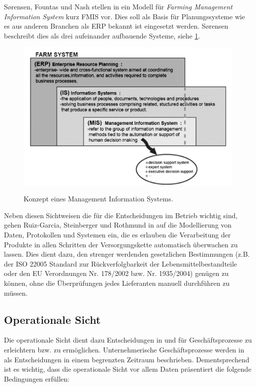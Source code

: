 S\o rensen, Fountas und Nash stellen in \cite{jour:Sorensen2010} ein Modell für \textit{Farming Management Information System} kurz FMIS vor. Dies soll als Basis für Planungssysteme wie es aus anderen Branchen als ERP bekannt ist eingesetzt werden. S\o rensen beschreibt dies als drei aufeinander aufbauende Systeme, siehe  \ref{fig:fmishierarchy}.

\begin{figure}[h]
 \includegraphics[scale=0.5,natwidth=\textwidth]{figures/datamodelling/sorensen_fmis_2010.png}
 \centering
 \label{fig:fmishierarchy}
 \caption{Konzept eines Management Information Systems.\cite{jour:Sorensen2010}}
\end{figure}

Neben diesen Sichtweisen die für die Entscheidungen im Betrieb wichtig sind, gehen Ruiz-Garcia, Steinberger und Rothmund in \cite{jour:Ruiz-Garcia2010} auf die Modellierung von Daten, Protokollen und Systemen ein, die es erlauben die Verarbeitung der Produkte in allen Schritten der Versorgungskette automatisch überwachen zu lassen. Dies dient dazu, den strenger werdenden gesetzlichen Bestimmungen (z.B. der ISO 22005 Standard zur Rückverfolgbarkeit der Lebensmittelbestandteile oder den EU Verordnungen Nr. 178/2002 bzw. Nr. 1935/2004) genügen zu können, ohne die Überprüfungen jedes Lieferanten manuell durchführen zu müssen.

\subsection{Operationale Sicht}
Die operationale Sicht dient dazu Entscheidungen in und für Geschäftsprozesse zu erleichtern bzw. zu ermöglichen. Unternehmerische Geschäftsprozesse werden in \cite{jour:Schulze2007} als Entscheidungen in einem begrenzten Zeitraum beschrieben. Dementsprechend ist es wichtig, dass die operationale Sicht vor allem Daten präsentiert die folgende Bedingungen erfüllen:

